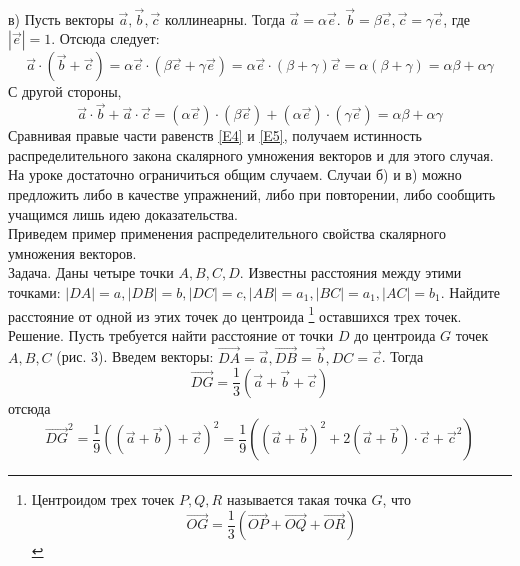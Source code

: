 \documentclass{article}
\begin{document}
%
%
%
%
\\в) Пусть векторы $\overrightarrow{a},\overrightarrow{b},\overrightarrow{c}$ коллинеарны. Тогда $\overrightarrow{a}=\alpha\overrightarrow{e}$. $\overrightarrow{b}=\beta\overrightarrow{e},\overrightarrow{c}=\gamma\overrightarrow{e}$, где $|\overrightarrow{e}|=1$. Отсюда следует:
\begin{equation}\label{E4}
\overrightarrow{a}\cdot(\overrightarrow{b}+\overrightarrow{c})=\alpha\overrightarrow{e}\cdot(\beta\overrightarrow{e}+\gamma\overrightarrow{e})=\alpha\overrightarrow{e}\cdot(\beta+\gamma)\overrightarrow{e}=\alpha(\beta+\gamma)=\alpha\beta+\alpha\gamma
\end{equation}
С другой стороны,
\begin{equation}\label{E5}
\overrightarrow{a}\cdot\overrightarrow{b}+\overrightarrow{a}\cdot\overrightarrow{c}=(\alpha\overrightarrow{e})\cdot(\beta\overrightarrow{e})+(\alpha\overrightarrow{e})\cdot(\gamma\overrightarrow{e})=\alpha\beta+\alpha\gamma
\end{equation}
Сравнивая правые части равенств \eqref{E4} и \eqref{E5}, получаем истинность распределительного закона скалярного умножения векторов и для этого случая.
\\На уроке достаточно ограничиться общим случаем. Случаи б) и в) можно предложить либо в качестве упражнений, либо при повторении, либо сообщить учащимся лишь идею доказательства.
\\Приведем пример применения распределительного свойства скалярного умножения векторов.
\\Задача. Даны четыре точки $A,B,C,D$. Известны расстояния между этими точками: $|DA|=a,|DB|=b,|DC|=c,|AB|=a_1,|BC|=a_1,|AC|=b_1$. Найдите расстояние от одной из этих точек до центроида \footnote[1]{Центроидом трех точек $P,Q,R$ называется такая точка $G$, что $$\overrightarrow{OG}=\frac{1}{3}(\overrightarrow{OP}+\overrightarrow{OQ}+\overrightarrow{OR})$$} оставшихся трех точек.
\\Решение. Пусть требуется найти расстояние от точки $D$ до центроида $G$ точек $A,B,C$ (рис. 3). Введем векторы: $\overrightarrow{DA}=\overrightarrow{a},\overrightarrow{DB}=\overrightarrow{b},DC=\overrightarrow{c}$. Тогда
$$\overrightarrow{DG}=\frac{1}{3}(\overrightarrow{a}+\overrightarrow{b}+\overrightarrow{c})$$
отсюда 
$$\overrightarrow{DG}^2=\frac{1}{9}((\overrightarrow{a}+\overrightarrow{b})+\overrightarrow{c})^2=\frac{1}{9}((\overrightarrow{a}+\overrightarrow{b})^2+2(\overrightarrow{a}+\overrightarrow{b})\cdot\overrightarrow{c}+\overrightarrow{c}^2)$$
\end{document}
